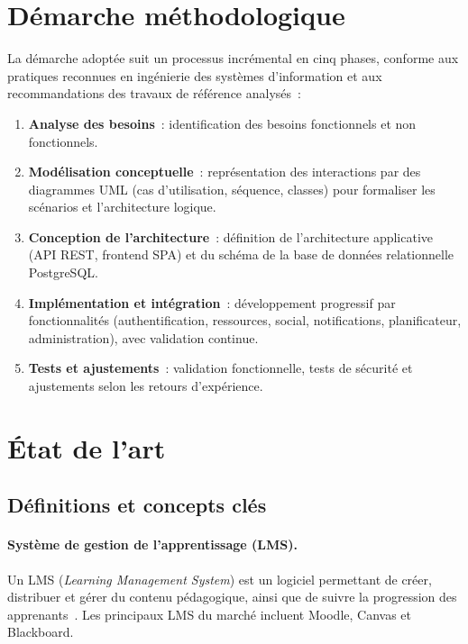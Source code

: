 \documentclass[12pt,a4paper,oneside]{report}
\begin{document}
\section{D\'emarche m\'ethodologique}
\label{sec:methodo}

La d\'emarche adopt\'ee suit un processus incr\'emental en cinq phases, conforme aux pratiques reconnues en ing\'enierie des syst\`emes d'information et aux recommandations des travaux de r\'ef\'erence analys\'es~:

\begin{enumerate}
  \item \textbf{Analyse des besoins}~: identification des besoins fonctionnels et non fonctionnels.
  \item \textbf{Mod\'elisation conceptuelle}~: repr\'esentation des interactions par des diagrammes UML (cas d'utilisation, s\'equence, classes) pour formaliser les sc\'enarios et l'architecture logique.
  \item \textbf{Conception de l'architecture}~: d\'efinition de l'architecture applicative (API REST, frontend SPA) et du sch\'ema de la base de donn\'ees relationnelle PostgreSQL.
  \item \textbf{Impl\'ementation et int\'egration}~: d\'eveloppement progressif par fonctionnalit\'es (authentification, ressources, social, notifications, planificateur, administration), avec validation continue.
  \item \textbf{Tests et ajustements}~: validation fonctionnelle, tests de s\'ecurit\'e et ajustements selon les retours d'exp\'erience.
\end{enumerate}

\section{\'Etat de l'art}
\label{sec:etat_art}

\subsection{D\'efinitions et concepts cl\'es}

\paragraph{Syst\`eme de gestion de l'apprentissage (LMS).}
Un LMS (\textit{Learning Management System}) est un logiciel permettant de cr\'eer, distribuer et g\'erer du contenu p\'edagogique, ainsi que de suivre la progression des apprenants~\cite{moodle_overview_2026}. Les principaux LMS du march\'e incluent Moodle, Canvas et Blackboard.
\end{document}
